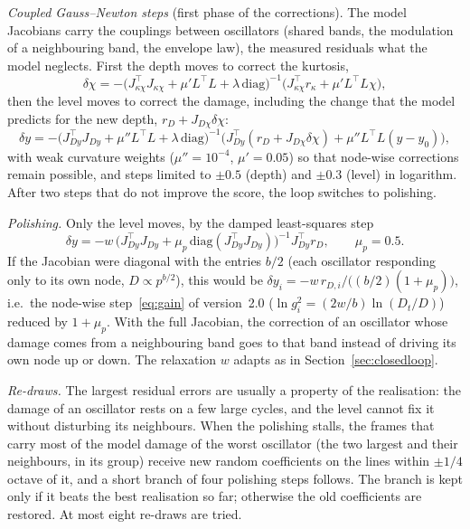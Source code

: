 \emph{Coupled Gauss--Newton steps} (first phase of the corrections). The model Jacobians carry the couplings between
oscillators (shared bands, the modulation of a neighbouring band, the envelope law), the measured
residuals what the model neglects. First the depth moves to correct the kurtosis,
\begin{equation}
  \delta\chi = -\bigl(J_{\kappa\chi}^{\top}J_{\kappa\chi} + \mu'L^{\top}L + \lambda\,\mathrm{diag}\bigr)^{-1}
  \bigl(J_{\kappa\chi}^{\top}r_\kappa + \mu'L^{\top}L\chi\bigr),
\end{equation}
then the level moves to correct the damage, including the change that the model predicts for the new
depth, $r_D + J_{D\chi}\delta\chi$:
\begin{equation}
  \delta y = -\bigl(J_{Dy}^{\top}J_{Dy} + \mu''L^{\top}L + \lambda\,\mathrm{diag}\bigr)^{-1}
  \bigl(J_{Dy}^{\top}(r_D + J_{D\chi}\delta\chi) + \mu''L^{\top}L(y-y_0)\bigr),
\end{equation}
with weak curvature weights ($\mu'' = 10^{-4}$, $\mu' = 0.05$) so that node-wise corrections remain
possible, and steps limited to $\pm0.5$ (depth) and $\pm0.3$ (level) in logarithm. After two steps
that do not improve the score, the loop switches to polishing.

\emph{Polishing.} Only the level moves, by the damped least-squares step
\begin{equation}
  \delta y = -w\,\bigl(J_{Dy}^{\top}J_{Dy} + \mu_p\,\mathrm{diag}(J_{Dy}^{\top}J_{Dy})\bigr)^{-1}J_{Dy}^{\top}r_D ,
  \qquad \mu_p = 0.5 .
\end{equation}
If the Jacobian were diagonal with the entries $b/2$ (each oscillator responding only to its own
node, $D\propto p^{b/2}$), this would be $\delta y_i = -w\,r_{D,i}/\bigl((b/2)(1+\mu_p)\bigr)$, i.e.\ the
node-wise step~\eqref{eq:gain} of version~2.0 ($\ln g_i^2 = (2w/b)\ln(D_t/D)$) reduced by $1+\mu_p$.
With the full Jacobian, the correction of an oscillator whose damage comes from a neighbouring band
goes to that band instead of driving its own node up or down. The relaxation $w$ adapts as in
Section~\ref{sec:closedloop}.

\emph{Re-draws.} The largest residual errors are usually a property of the realisation: the damage of
an oscillator rests on a few large cycles, and the level cannot fix it without disturbing its
neighbours. When the polishing stalls, the frames that carry most of the model damage of the worst
oscillator (the two largest and their neighbours, in its group) receive new random coefficients on
the lines within $\pm1/4$ octave of it, and a short branch of four polishing steps follows. The branch is
kept only if it beats the best realisation so far; otherwise the old coefficients are restored. At most
eight re-draws are tried.

